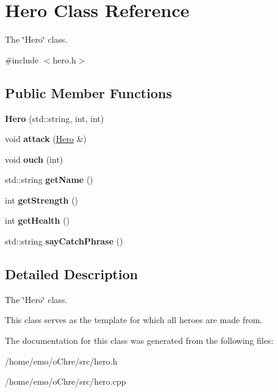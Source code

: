 \hypertarget{classHero}{}\section{Hero Class Reference}
\label{classHero}


The \char`\"{}\+Hero\char`\"{} class.  




{\ttfamily \#include $<$hero.\+h$>$}

\subsection*{Public Member Functions}
\begin{DoxyCompactItemize}
\item 
\mbox{\label{classHero_ad335448183a6875d08a5f51dea140e65}} 
{\bfseries Hero} (std\+::string, int, int)
\item 
\mbox{\label{classHero_aded4701b5cb1b065acfa9f898d4181ce}} 
void {\bfseries attack} (\hyperlink{classHero}{Hero} \&)
\item 
\mbox{\label{classHero_aea01a45fd8bc7a376ef50d671428891b}} 
void {\bfseries ouch} (int)
\item 
\mbox{\label{classHero_a4edbcb816ca444da6ceed1556d1a21d9}} 
std\+::string {\bfseries get\+Name} ()
\item 
\mbox{\label{classHero_ab28172833ac7157372183abaaa68e054}} 
int {\bfseries get\+Strength} ()
\item 
\mbox{\label{classHero_ac74825f98e0e0473391d5c47881da9b4}} 
int {\bfseries get\+Health} ()
\item 
\mbox{\label{classHero_ac516a12bb462336b15ae6ce9e3422d60}} 
std\+::string {\bfseries say\+Catch\+Phrase} ()
\end{DoxyCompactItemize}


\subsection{Detailed Description}
The \char`\"{}\+Hero\char`\"{} class. 

This class serves as the template for which all heroes are made from. 

The documentation for this class was generated from the following files\+:\begin{DoxyCompactItemize}
\item 
/home/emo/o\+Chre/src/hero.\+h\item 
/home/emo/o\+Chre/src/hero.\+cpp\end{DoxyCompactItemize}
